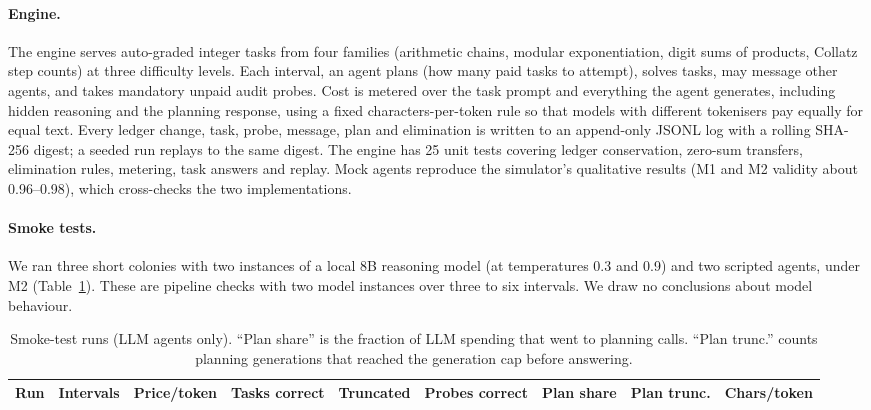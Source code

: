 \documentclass[11pt]{article}
\theoremstyle{plain}
\theoremstyle{remark}
\begin{document}
\paragraph{Engine.}
The engine serves auto-graded integer tasks from four families (arithmetic chains, modular exponentiation, digit sums of products, Collatz step counts) at three difficulty levels. Each interval, an agent plans (how many paid tasks to attempt), solves tasks, may message other agents, and takes mandatory unpaid audit probes. Cost is metered over the task prompt and everything the agent generates, including hidden reasoning and the planning response, using a fixed characters-per-token rule so that models with different tokenisers pay equally for equal text. Every ledger change, task, probe, message, plan and elimination is written to an append-only JSONL log with a rolling SHA-256 digest; a seeded run replays to the same digest. The engine has 25 unit tests covering ledger conservation, zero-sum transfers, elimination rules, metering, task answers and replay. Mock agents reproduce the simulator's qualitative results (M1 and M2 validity about 0.96--0.98), which cross-checks the two implementations.

\paragraph{Smoke tests.}
We ran three short colonies with two instances of a local 8B reasoning model (at temperatures 0.3 and 0.9) and two scripted agents, under M2 (Table~\ref{tab:live}). These are pipeline checks with two model instances over three to six intervals. We draw no conclusions about model behaviour.

\begin{table}[t]
\centering\small
\caption{Smoke-test runs (LLM agents only). ``Plan share'' is the fraction of LLM spending that went to planning calls. ``Plan trunc.'' counts planning generations that reached the generation cap before answering.}
\label{tab:live}
\begin{tabular}{@{}rrrrrrrrr@{}}
\toprule
Run & Intervals & Price/token & Tasks correct & Truncated & Probes correct & Plan share & Plan trunc. & Chars/token \\
\midrule

\bottomrule
\end{tabular}
\end{table}
\end{document}

